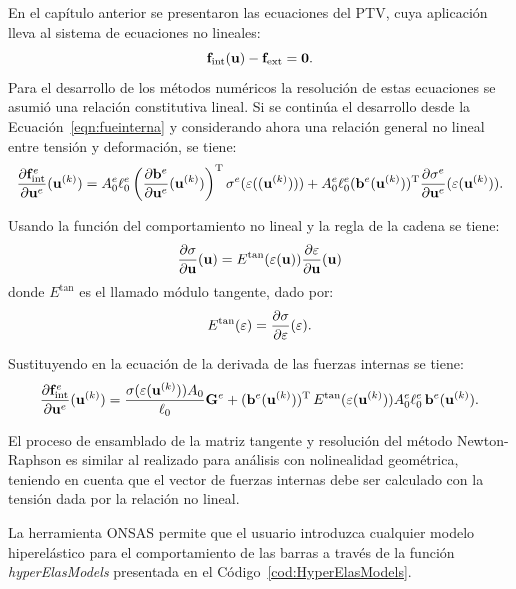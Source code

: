 En el capítulo anterior se presentaron las ecuaciones del PTV, cuya aplicación lleva al sistema de ecuaciones no lineales:
%
\begin{equation}
  {\bf f}_{\text{int}}({\bf u}) - {\bf f}_{\text{ext}} = \boldsymbol{0}.
\end{equation}
%
Para el desarrollo de los métodos numéricos la resolución de estas ecuaciones se asumió una relación constitutiva lineal. %
%
Si se continúa el desarrollo desde la Ecuación~\eqref{eqn:fueinterna} y considerando ahora una relación general no lineal entre tensión y deformación, se tiene:
%
\begin{equation}
\frac{\partial {\bf f}^e_{\text{int}} } {\partial {\bf u}^e} ({\bf u}^{(k)}) 
= A_0^e \ell_0^e \left( \frac{\partial {\bf b}^e}{\partial {\bf u}^e} ({\bf u}^{(k)}) \right)^{\text{T}} \sigma^e(\varepsilon(({\bf u}^{(k)})))
+ A_0^e \ell_0^e  ({\bf b}^e({\bf u}^{(k)}))^{\text{T}} \frac{ \partial \sigma^e}{\partial {\bf u}^e}( \varepsilon( {\bf u}^{(k)}) ).
\end{equation}

Usando la función del comportamiento no lineal y la regla de la cadena se tiene:
\begin{equation}
\frac{ \partial \sigma}{\partial {\bf u}}({\bf u}) = E^{\text{tan}}(\varepsilon({\bf u})) \frac{ \partial \varepsilon}{\partial {\bf u}}({\bf u})
\end{equation}
donde $E^{\text{tan}}$ es el llamado módulo tangente, dado por:
\begin{equation}
E^{\text{tan}}(\varepsilon) = \frac{ \partial \sigma}{\partial \varepsilon} (\varepsilon).
\end{equation}

Sustituyendo en la ecuación de la derivada de las fuerzas internas se tiene:
\begin{equation}
\frac{\partial {\bf f}_{\text{int}}^e } {\partial {\bf u}^e} ({\bf u}^{(k)})
= \frac{\sigma ( \varepsilon( {\bf u}^{(k)}) ) A_0 }{\ell_0} {\bf G}^e
+  ({\bf b}^e({\bf u}^{(k)}))^{\text{T}} \,  E^{\text{tan}} (\varepsilon({\bf u}^{(k)})) A_0^e \ell_0^e \, {\bf b}^e({\bf u}^{(k)}).
\end{equation}

El proceso de ensamblado de la matriz tangente y resolución del método Newton-Raphson es similar al realizado para análisis con nolinealidad geométrica, teniendo en cuenta que el vector de fuerzas internas debe ser calculado con la tensión dada por la relación no lineal.


La herramienta ONSAS permite que el usuario introduzca cualquier modelo hiperelástico para el comportamiento de las barras a través de la función \textit{hyperElasModels} presentada en el Código~\ref{cod:HyperElasModels}.


